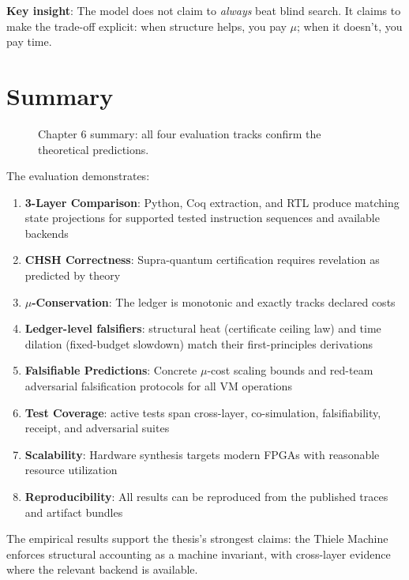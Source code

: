 \textbf{Key insight}: The model does not claim to \emph{always} beat blind search. It claims to make the trade-off explicit: when structure helps, you pay $\mu$; when it doesn't, you pay time.

\section{Summary}

\begin{figure}[h]
\centering
{}
\caption{Chapter 6 summary: all four evaluation tracks confirm the theoretical predictions.}
\label{fig:ch6-summary}
\end{figure}
The evaluation demonstrates:
\begin{enumerate}
    \item \textbf{3-Layer Comparison}: Python, Coq extraction, and RTL produce matching state projections for supported tested instruction sequences and available backends
    \item \textbf{CHSH Correctness}: Supra-quantum certification requires revelation as predicted by theory
    \item \textbf{$\mu$-Conservation}: The ledger is monotonic and exactly tracks declared costs
    \item \textbf{Ledger-level falsifiers}: structural heat (certificate ceiling law) and time dilation (fixed-budget slowdown) match their first-principles derivations
    \item \textbf{Falsifiable Predictions}: Concrete $\mu$-cost scaling bounds and red-team adversarial falsification protocols for all VM operations
    \item \textbf{Test Coverage}: active tests span cross-layer, co-simulation, falsifiability, receipt, and adversarial suites
    \item \textbf{Scalability}: Hardware synthesis targets modern FPGAs with reasonable resource utilization
    \item \textbf{Reproducibility}: All results can be reproduced from the published traces and artifact bundles
\end{enumerate}

The empirical results support the thesis's strongest claims: the Thiele Machine enforces structural accounting as a machine invariant, with cross-layer evidence where the relevant backend is available.
